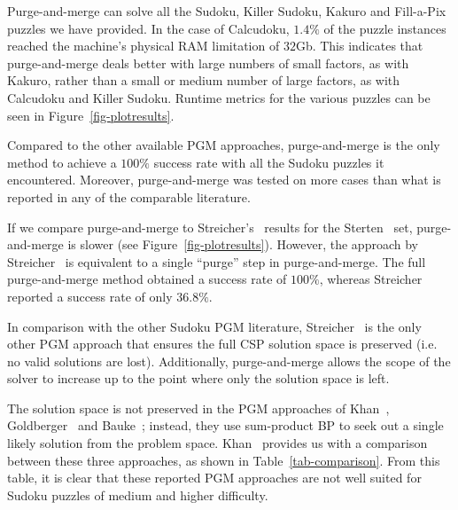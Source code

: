 \documentclass{ieeeaccess}
\begin{document}
{	Purge-and-merge can solve all the Sudoku, Killer Sudoku, Kakuro and Fill-a-Pix puzzles we have provided. In the case of Calcudoku, $1.4\%$ of the puzzle instances reached the machine's physical RAM limitation of $32$Gb. This indicates that purge-and-merge deals better with large numbers of small factors, as with Kakuro, rather than a small or medium number of large factors, as with Calcudoku and Killer Sudoku. Runtime metrics for the various puzzles can be seen in Figure~\ref{fig-plotresults}.
	
	
	Compared to the other available PGM approaches, purge-and-merge is the only method to achieve a $100\%$ success rate with all the Sudoku puzzles it encountered. Moreover, purge-and-merge was tested on more cases than what is reported in any of the comparable literature.
	
	If we compare purge-and-merge to Streicher's~\cite{streicher} results for the Sterten~\cite{sterten} set, purge-and-merge is slower (see Figure~\ref{fig-plotresults}). However, the approach by Streicher~\cite{streicher} is equivalent to a single ``purge'' step in purge-and-merge. The full purge-and-merge method obtained a success rate of $100\%$, whereas Streicher~\cite{streicher} reported a success rate of only $36.8\%$.
	
	In comparison with the other Sudoku PGM literature, Streicher~\cite{streicher} is the only other PGM approach that ensures the full CSP solution space is preserved (i.e. no valid solutions are lost). Additionally, purge-and-merge allows the scope of the solver to increase up to the point where only the solution space is left.
	
	The solution space is not preserved in the PGM approaches of Khan~\cite{KhanS}, Goldberger~\cite{GoldbergerJ} and Bauke~\cite{BaukeH}; instead, they use sum-product BP to seek out a single likely solution from the problem space. Khan~\cite{KhanS} provides us with a comparison between these three approaches, as shown in Table~\ref{tab-comparison}. From this table, it is clear that these reported PGM approaches are not well suited for Sudoku puzzles of medium and higher difficulty.
	
}
\end{document}
